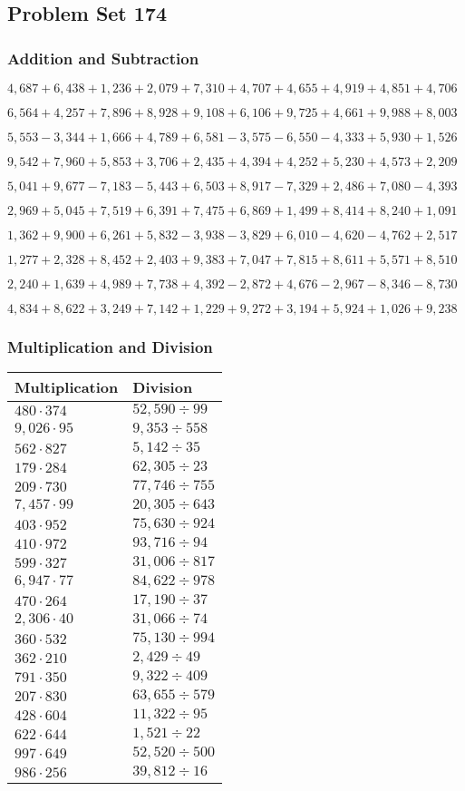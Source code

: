 \hypertarget{problem-set-174}{%
\subsection{Problem Set 174}\label{problem-set-174}}

\hypertarget{addition-and-subtraction}{%
\subsubsection{Addition and
Subtraction}\label{addition-and-subtraction}}

\(4,687+6,438+1,236+2,079+7,310+4,707+4,655+4,919+4,851+4,706\)

\(6,564+4,257+7,896+8,928+9,108+6,106+9,725+4,661+9,988+8,003\)

\(5,553-3,344+1,666+4,789+6,581-3,575-6,550-4,333+5,930+1,526\)

\(9,542+7,960+5,853+3,706+2,435+4,394+4,252+5,230+4,573+2,209\)

\(5,041+9,677-7,183-5,443+6,503+8,917-7,329+2,486+7,080-4,393\)

\(2,969+5,045+7,519+6,391+7,475+6,869+1,499+8,414+8,240+1,091\)

\(1,362+9,900+6,261+5,832-3,938-3,829+6,010-4,620-4,762+2,517\)

\(1,277+2,328+8,452+2,403+9,383+7,047+7,815+8,611+5,571+8,510\)

\(2,240+1,639+4,989+7,738+4,392-2,872+4,676-2,967-8,346-8,730\)

\(4,834+8,622+3,249+7,142+1,229+9,272+3,194+5,924+1,026+9,238\)

\hypertarget{multiplication-and-division}{%
\subsubsection{Multiplication and
Division}\label{multiplication-and-division}}

\begin{longtable}[]{@{}ll@{}}
\toprule
Multiplication & Division\tabularnewline
\midrule
\endhead
\(480\cdot374\) & \(52,590÷99\)\tabularnewline
\(9,026\cdot95\) & \(9,353÷558\)\tabularnewline
\(562\cdot827\) & \(5,142÷35\)\tabularnewline
\(179\cdot284\) & \(62,305÷23\)\tabularnewline
\(209\cdot730\) & \(77,746÷755\)\tabularnewline
\(7,457\cdot99\) & \(20,305÷643\)\tabularnewline
\(403\cdot952\) & \(75,630÷924\)\tabularnewline
\(410\cdot972\) & \(93,716÷94\)\tabularnewline
\(599\cdot327\) & \(31,006÷817\)\tabularnewline
\(6,947\cdot77\) & \(84,622÷978\)\tabularnewline
\(470\cdot264\) & \(17,190÷37\)\tabularnewline
\(2,306\cdot40\) & \(31,066÷74\)\tabularnewline
\(360\cdot532\) & \(75,130÷994\)\tabularnewline
\(362\cdot210\) & \(2,429÷49\)\tabularnewline
\(791\cdot350\) & \(9,322÷409\)\tabularnewline
\(207\cdot830\) & \(63,655÷579\)\tabularnewline
\(428\cdot604\) & \(11,322÷95\)\tabularnewline
\(622\cdot644\) & \(1,521÷22\)\tabularnewline
\(997\cdot649\) & \(52,520÷500\)\tabularnewline
\(986\cdot256\) & \(39,812÷16\)\tabularnewline
\bottomrule
\end{longtable}
